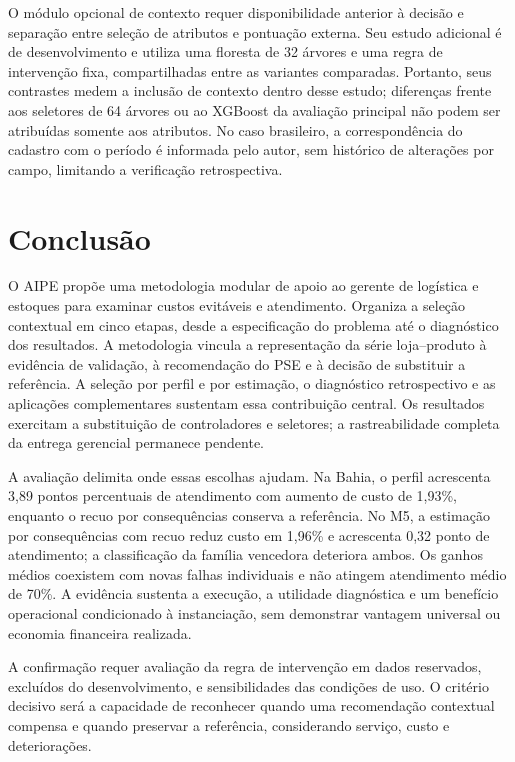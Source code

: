 \documentclass[preprint,12pt]{elsarticle}
\begin{document}
O módulo opcional de contexto requer disponibilidade anterior à decisão e separação entre seleção de atributos e pontuação externa. Seu estudo adicional é de desenvolvimento e utiliza uma floresta de 32 árvores e uma regra de intervenção fixa, compartilhadas entre as variantes comparadas. Portanto, seus contrastes medem a inclusão de contexto dentro desse estudo; diferenças frente aos seletores de 64 árvores ou ao XGBoost da avaliação principal não podem ser atribuídas somente aos atributos. No caso brasileiro, a correspondência do cadastro com o período é informada pelo autor, sem histórico de alterações por campo, limitando a verificação retrospectiva.

\section{Conclusão}
O AIPE propõe uma metodologia modular de apoio ao gerente de logística e estoques para examinar custos evitáveis e atendimento. Organiza a seleção contextual em cinco etapas, desde a especificação do problema até o diagnóstico dos resultados. A metodologia vincula a representação da série loja--produto à evidência de validação, à recomendação do PSE e à decisão de substituir a referência. A seleção por perfil e por estimação, o diagnóstico retrospectivo e as aplicações complementares sustentam essa contribuição central. Os resultados exercitam a substituição de controladores e seletores; a rastreabilidade completa da entrega gerencial permanece pendente.

A avaliação delimita onde essas escolhas ajudam. Na Bahia, o perfil acrescenta 3,89 pontos percentuais de atendimento com aumento de custo de 1,93\%, enquanto o recuo por consequências conserva a referência. No M5, a estimação por consequências com recuo reduz custo em 1,96\% e acrescenta 0,32 ponto de atendimento; a classificação da família vencedora deteriora ambos. Os ganhos médios coexistem com novas falhas individuais e não atingem atendimento médio de 70\%. A evidência sustenta a execução, a utilidade diagnóstica e um benefício operacional condicionado à instanciação, sem demonstrar vantagem universal ou economia financeira realizada.

A confirmação requer avaliação da regra de intervenção em dados reservados, excluídos do desenvolvimento, e sensibilidades das condições de uso. O critério decisivo será a capacidade de reconhecer quando uma recomendação contextual compensa e quando preservar a referência, considerando serviço, custo e deteriorações.
\end{document}
